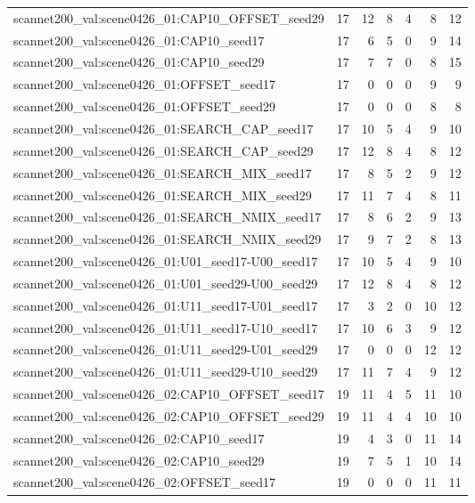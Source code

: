 \begin{table}[t]
\begin{tabular}{lrrrrrr}
scannet200\_val:scene0426\_01:CAP10\_OFFSET\_seed29 & 17 & 12 & 8 & 4 & 8 & 12 \\
scannet200\_val:scene0426\_01:CAP10\_seed17 & 17 & 6 & 5 & 0 & 9 & 14 \\
scannet200\_val:scene0426\_01:CAP10\_seed29 & 17 & 7 & 7 & 0 & 8 & 15 \\
scannet200\_val:scene0426\_01:OFFSET\_seed17 & 17 & 0 & 0 & 0 & 9 & 9 \\
scannet200\_val:scene0426\_01:OFFSET\_seed29 & 17 & 0 & 0 & 0 & 8 & 8 \\
scannet200\_val:scene0426\_01:SEARCH\_CAP\_seed17 & 17 & 10 & 5 & 4 & 9 & 10 \\
scannet200\_val:scene0426\_01:SEARCH\_CAP\_seed29 & 17 & 12 & 8 & 4 & 8 & 12 \\
scannet200\_val:scene0426\_01:SEARCH\_MIX\_seed17 & 17 & 8 & 5 & 2 & 9 & 12 \\
scannet200\_val:scene0426\_01:SEARCH\_MIX\_seed29 & 17 & 11 & 7 & 4 & 8 & 11 \\
scannet200\_val:scene0426\_01:SEARCH\_NMIX\_seed17 & 17 & 8 & 6 & 2 & 9 & 13 \\
scannet200\_val:scene0426\_01:SEARCH\_NMIX\_seed29 & 17 & 9 & 7 & 2 & 8 & 13 \\
scannet200\_val:scene0426\_01:U01\_seed17-U00\_seed17 & 17 & 10 & 5 & 4 & 9 & 10 \\
scannet200\_val:scene0426\_01:U01\_seed29-U00\_seed29 & 17 & 12 & 8 & 4 & 8 & 12 \\
scannet200\_val:scene0426\_01:U11\_seed17-U01\_seed17 & 17 & 3 & 2 & 0 & 10 & 12 \\
scannet200\_val:scene0426\_01:U11\_seed17-U10\_seed17 & 17 & 10 & 6 & 3 & 9 & 12 \\
scannet200\_val:scene0426\_01:U11\_seed29-U01\_seed29 & 17 & 0 & 0 & 0 & 12 & 12 \\
scannet200\_val:scene0426\_01:U11\_seed29-U10\_seed29 & 17 & 11 & 7 & 4 & 9 & 12 \\
scannet200\_val:scene0426\_02:CAP10\_OFFSET\_seed17 & 19 & 11 & 4 & 5 & 11 & 10 \\
scannet200\_val:scene0426\_02:CAP10\_OFFSET\_seed29 & 19 & 11 & 4 & 4 & 10 & 10 \\
scannet200\_val:scene0426\_02:CAP10\_seed17 & 19 & 4 & 3 & 0 & 11 & 14 \\
scannet200\_val:scene0426\_02:CAP10\_seed29 & 19 & 7 & 5 & 1 & 10 & 14 \\
scannet200\_val:scene0426\_02:OFFSET\_seed17 & 19 & 0 & 0 & 0 & 11 & 11 \\

\end{tabular}
\end{table}
